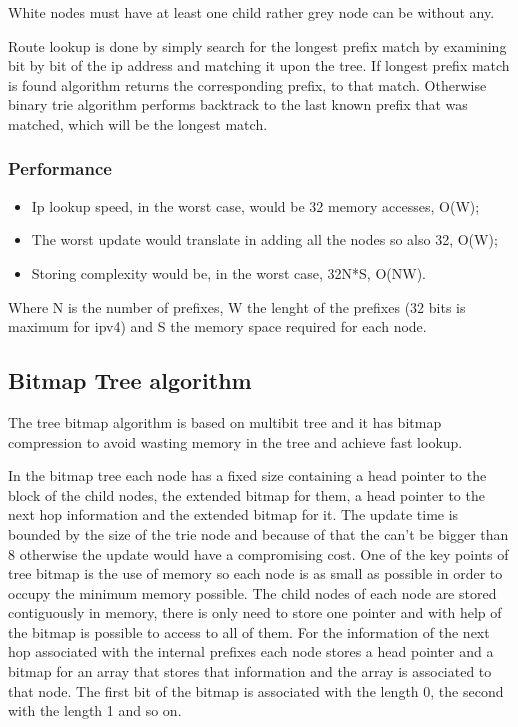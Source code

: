 \documentclass[]{report}
\begin{document}
White nodes must have at least one child rather grey node can be without any.

Route lookup is done by simply search for the longest prefix match by examining bit by bit of the ip address and matching it upon the tree. If longest prefix match is found algorithm returns the corresponding prefix, to that match. Otherwise binary trie algorithm performs backtrack to the last known prefix that was matched, which will be the longest match.

\subsubsection{Performance}
\begin{itemize}
\item Ip lookup speed, in the worst case, would be 32 memory accesses, O(W);
\item The worst update would translate in adding all the nodes so also 32, O(W);
\item Storing complexity would be, in the worst case, 32N*S, O(NW).
\end{itemize}

Where N is the number of prefixes, W the lenght of the prefixes (32 bits is maximum for ipv4) and S the memory space required for each node.

\subsection{Bitmap Tree algorithm}
The tree bitmap algorithm is based on multibit tree and it has bitmap compression to avoid wasting memory in the tree and achieve fast lookup.

In the bitmap tree each node has a fixed size containing a head pointer to the block of the child nodes, the extended bitmap for them, a head pointer to the next hop information and the extended bitmap for it. The update time is bounded by the size of the trie node and because of that the can’t be bigger than 8 otherwise the update would have a compromising cost. One of the key points of tree bitmap is the use of memory so each node is as small as possible in order to occupy the minimum memory possible. The child nodes of each node are stored contiguously in memory, there is only need to store one pointer and with help of the bitmap is possible to access to all of them. For the information of the next hop associated with the internal prefixes each node stores a head pointer and a bitmap for an array that stores that information and the array is associated to that node. The first bit of the bitmap is associated with the length 0, the second with the length 1 and so on.
\end{document}
